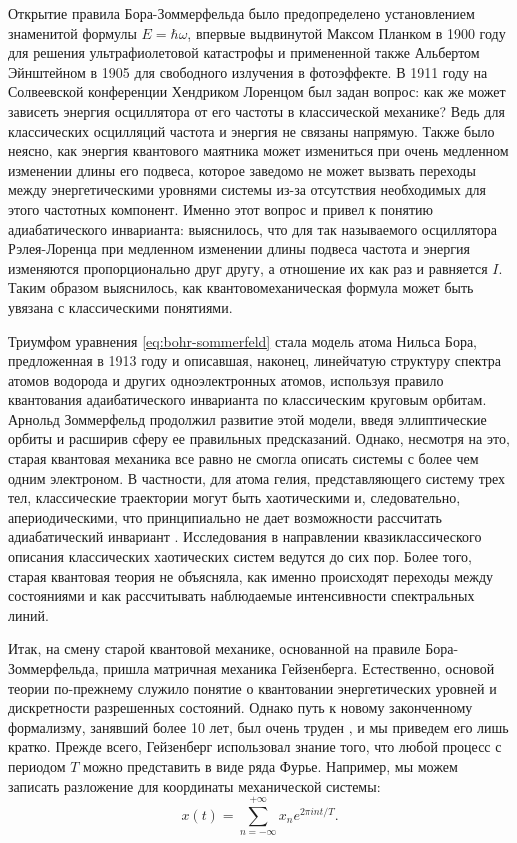 \documentclass[14pt, a4paper]{extreport}
\numberwithin{equation}{section}
\begin{document}
Открытие правила Бора-Зоммерфельда было предопределено установлением знаменитой формулы $E = \hbar \omega$, впервые выдвинутой Максом Планком в 1900 году для решения ультрафиолетовой катастрофы и примененной также Альбертом Эйнштейном в 1905 для свободного излучения в фотоэффекте. В 1911 году на Солвеевской конференции Хендриком Лоренцом был задан вопрос: как же может зависеть энергия осциллятора от его частоты в классической механике? Ведь для классических осцилляций частота и энергия не связаны напрямую. Также было неясно, как энергия квантового маятника может измениться при очень медленном изменении длины его подвеса, которое заведомо не может вызвать переходы между энергетическими уровнями системы из-за отсутствия необходимых для этого частотных компонент. Именно этот вопрос и привел к понятию адиабатического инварианта: выяснилось, что для так называемого осциллятора Рэлея-Лоренца при медленном изменении длины подвеса частота и энергия изменяются пропорционально друг другу, а отношение их как раз и равняется $I$. Таким образом выяснилось, как квантовомеханическая формула может быть увязана с классическими понятиями.

Триумфом уравнения \eqref{eq:bohr-sommerfeld} стала модель атома Нильса Бора, предложенная в 1913 году и описавшая, наконец, линейчатую структуру спектра атомов водорода и других одноэлектронных атомов, используя правило квантования адаибатического инварианта по классическим круговым орбитам. Арнольд Зоммерфельд продолжил развитие этой модели, введя эллиптические орбиты и расширив сферу ее правильных предсказаний. Однако, несмотря на это, старая квантовая механика все равно не смогла описать системы с более чем одним электроном. В частности, для атома гелия, представляющего систему трех тел, классические траектории могут быть хаотическими и, следовательно, апериодическими, что принципиально не дает возможности рассчитать адиабатический инвариант \cite{wintgen1992semiclassical}. Исследования в направлении квазиклассического описания классических хаотических систем ведутся до сих пор. Более того, старая квантовая теория не объясняла, как именно происходят переходы между состояниями и как рассчитывать наблюдаемые интенсивности спектральных линий.

Итак, на смену старой квантовой механике, основанной на правиле Бора-Зоммерфельда, пришла матричная механика Гейзенберга. Естественно, основой теории по-прежнему служило понятие о квантовании энергетических уровней и дискретности разрешенных состояний. Однако путь к новому законченному формализму, занявший более 10 лет, был очень труден \cite{van2007sources}, и мы приведем его лишь кратко. Прежде всего, Гейзенберг использовал знание того, что любой процесс с периодом $T$ можно представить в виде ряда Фурье. Например, мы можем записать разложение для координаты механической системы:
\begin{equation}
	x(t) = \sum_{n=-\infty}^{+\infty} x_n e^{2\pi i n t/T}.\label{eq:fourier}
\end{equation}
\end{document}
